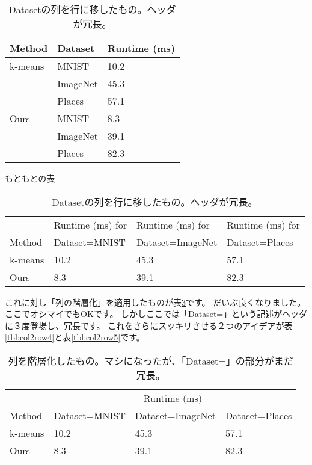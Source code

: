 \documentclass[uplatex,onecolumn,9pt,dvipdfmx]{jsarticle}
\newcommand{\Tref}[1]{表\ref{#1}}
\begin{document}
\begin{table}[h]
    \begin{minipage}{0.32\linewidth}
        \centering
        \begin{tabular}{@{}lll@{}} \toprule
            Method & Dataset & Runtime (ms) \\ \midrule
            k-means   & MNIST    & 10.2 \\ 
                      & ImageNet & 45.3 \\ 
                      & Places   & 57.1 \\ 
            Ours      & MNIST    & 8.3 \\ 
                      & ImageNet & 39.1 \\ 
                      & Places   & 82.3 \\ \bottomrule   
        \end{tabular}
        \caption{もともとの表}
        \label{tbl:col2row1}
    \end{minipage}
    \hfill
    \begin{minipage}{0.67\linewidth}
        \centering
        \begin{tabular}{@{}llll@{}} \toprule
                   & Runtime (ms) for & Runtime (ms) for & Runtime (ms) for         \\
            Method & Dataset=MNIST & Dataset=ImageNet & Dataset=Places \\ \midrule
            k-means   & 10.2 & 45.3 & 57.1 \\ 
            Ours      & 8.3  & 39.1 & 82.3 \\ \bottomrule   
        \end{tabular}
        \caption{Datasetの列を行に移したもの。ヘッダが冗長。}
        \label{tbl:col2row2}
    \end{minipage}
\end{table}

これに対し「列の階層化」を適用したものが\Tref{tbl:col2row3}です。
だいぶ良くなりました。ここでオシマイでもOKです。
しかしここでは「Dataset=」という記述がヘッダに３度登場し、冗長です。
これをさらにスッキリさせる２つのアイデアが\Tref{tbl:col2row4}と\Tref{tbl:col2row5}です。


\begin{table}[h]
    \centering
    \begin{tabular}{@{}llll@{}} \toprule
                & \multicolumn{3}{c}{Runtime (ms)}  \\ \cmidrule(l){2-4}
        Method & Dataset=MNIST & Dataset=ImageNet & Dataset=Places \\ \midrule
        k-means   & 10.2 & 45.3 & 57.1 \\ 
        Ours      & 8.3  & 39.1 & 82.3 \\ \bottomrule   
    \end{tabular}
    \caption{列を階層化したもの。マシになったが、「Dataset=」の部分がまだ冗長。}
    \label{tbl:col2row3}
\end{table}
\end{document}
